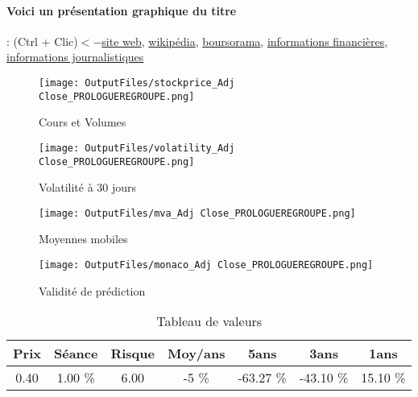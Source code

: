 \documentclass[11pt,a4paper]{report}%
\begin{document}
\paragraph{Voici un présentation graphique du titre} : (Ctrl + Clic)$<-$\href{http://www.prologue.fr/}{site web}, \href{https://fr.wikipedia.org/wiki/Prologue_(entreprise)}{wikipédia}, \href{https://www.boursorama.com/cours/1rPPROL}{boursorama}, \href{https://www.qwant.com/?q=site:https:%2f%2fwww.easybourse.com%2faction-societe%2fPROLOGUEREGROUPE&t=web&client=ext-firefox-hp}{informations financières}, \href{https://bourse.lerevenu.com/cours-de-bourse/fiche-valeur-synthese/PROLOGUEREGROUPE/PROL-FR}{informations journalistiques}
\begin{figure}[!htb]
   \begin{minipage}{0.5\textwidth}
     \centering
     \texttt{[image: OutputFiles/stockprice\_Adj Close\_PROLOGUEREGROUPE.png]}
     \caption{Cours et Volumes}\label{Fig:price_PROLOGUEREGROUPE}
   \end{minipage}\hfill
   \begin{minipage}{0.5\textwidth}
     \centering
     \texttt{[image: OutputFiles/volatility\_Adj Close\_PROLOGUEREGROUPE.png]}
     \caption{Volatilité à 30 jours}\label{Fig:volat_PROLOGUEREGROUPE}
   \end{minipage}
\end{figure}
\begin{figure}[!htb]
   \begin{minipage}{0.5\textwidth}
     \centering
     \texttt{[image: OutputFiles/mva\_Adj Close\_PROLOGUEREGROUPE.png]}
     \caption{Moyennes mobiles}\label{Fig:mva_PROLOGUEREGROUPE}
   \end{minipage}\hfill
   \begin{minipage}{0.5\textwidth}
     \centering
     \texttt{[image: OutputFiles/monaco\_Adj Close\_PROLOGUEREGROUPE.png]}
     \caption{Validité de prédiction}\label{Fig:prediction_PROLOGUEREGROUPE}
   \end{minipage}
\end{figure}

\begin{table}[H]
  \centering
    \begin{tabular}{|c|c|c|c|c|c|c|}
    \hline
    Prix & Séance & Risque  & Moy/ans & 5ans & 3ans & 1ans \\
    \hline
    0.40 &    1.00 \%    & 6.00 & -5 \% & -63.27 \% & -43.10 \% & 15.10 \% \\
    \hline
    \end{tabular}%
        \label{tab:table_PRO-5UEREGROUPE}%
      \caption{Tableau de valeurs}
\end{table}%
\end{document}
